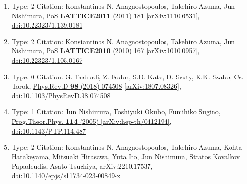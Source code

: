 \documentclass[a4paper,10pt]{article}
\begin{document}
\begin{enumerate}
\begin{enumerate}
  \item Type: 2 Citation: Konstantinos N. Anagnostopoulos, Takehiro Azuma, Jun Nishimura, \href{https://www.doi.org/10.22323/1.139.0181}{PoS {\bf LATTICE2011} (2011) 181}  \href{https://arxiv.org/abs/1110.6531}{[arXiv:1110.6531]},\\\href{https://www.doi.org/10.22323/1.139.0181}{doi:10.22323/1.139.0181}
  \item Type: 2 Citation: Konstantinos N. Anagnostopoulos, Takehiro Azuma, Jun Nishimura, \href{https://www.doi.org/10.22323/1.105.0167}{PoS {\bf LATTICE2010} (2010) 167}  \href{https://arxiv.org/abs/1010.0957}{[arXiv:1010.0957]},\\\href{https://www.doi.org/10.22323/1.105.0167}{doi:10.22323/1.105.0167}
  \item Type: 0 Citation: G. Endrodi, Z. Fodor, S.D. Katz, D. Sexty, K.K. Szabo, Cs. Torok, \href{https://www.doi.org/10.1103/PhysRevD.98.074508}{Phys.Rev.D {\bf 98} (2018) 074508}  \href{https://arxiv.org/abs/1807.08326}{[arXiv:1807.08326]},\\\href{https://www.doi.org/10.1103/PhysRevD.98.074508}{doi:10.1103/PhysRevD.98.074508}
  \item Type: 1 Citation: Jun Nishimura, Toshiyuki Okubo, Fumihiko Sugino, \href{https://www.doi.org/10.1143/PTP.114.487}{Prog.Theor.Phys. {\bf 114} (2005) }  \href{https://arxiv.org/abs/hep-th/0412194}{[arXiv:hep-th/0412194]},\\\href{https://www.doi.org/10.1143/PTP.114.487}{doi:10.1143/PTP.114.487}
  \item Type: 2 Citation: Konstantinos N. Anagnostopoulos, Takehiro Azuma, Kohta Hatakeyama, Mitsuaki Hirasawa, Yuta Ito, Jun Nishimura, Stratos Kovalkov Papadoudis, Asato Tsuchiya, \href{https://arxiv.org/abs/2210.17537}{arXiv:2210.17537},\\\href{https://www.doi.org/10.1140/epjs/s11734-023-00849-x}{doi:10.1140/epjs/s11734-023-00849-x}

\end{enumerate}
\end{enumerate}
\end{document}
